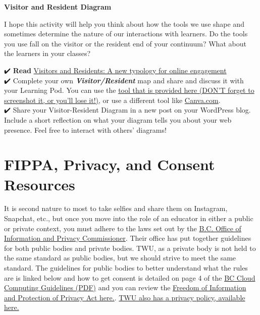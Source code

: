 \documentclass[
]{book}
\begin{document}
\begin{wp}
\textbf{Visitor and Resident Diagram}

I hope this activity will help you think about how the tools we use shape and sometimes determine the nature of our interactions with learners. Do the tools you use fall on the visitor or the resident end of your continuum? What about the learners in your classes?

✔️ \textbf{Read} \href{https://firstmonday.org/ojs/index.php/fm/article/view/3171}{Visitors and Residents: A new typology for online engagement}\\
✔️ Complete your own \textbf{\emph{Visitor/Resident}} map and share and discuss it with your Learning Pod. You can use the \href{https://experimental.worldcat.org/vandrmapping/editMap}{tool that is provided here (DON'T forget to screenshot it, or you'll lose it!)}, or use a different tool like \href{https://canva.com}{Canva.com}.\\
✔️ Share your Visitor-Resident Diagram in a new post on your WordPress blog. Include a short reflection on what your diagram tells you about your web presence. Feel free to interact with others' diagrams!
\end{wp}

\hypertarget{fippa-privacy-and-consent-resources}{%
\section{FIPPA, Privacy, and Consent Resources}\label{fippa-privacy-and-consent-resources}}

It is second nature to most to take selfies and share them on Instagram, Snapchat, etc., but once you move into the role of an educator in either a public or private context, you must adhere to the laws set out by the \href{https://www.oipc.bc.ca/}{B.C. Office of Information and Privacy Commissioner}. Their office has put together guidelines for both public bodies and private bodies. TWU, as a private body is not held to the same standard as public bodies, but we should strive to meet the same standard. The guidelines for public bodies to better understand what the rules are is linked below and how to get consent is detailed on page 4 of the \href{https://esquimalt.public.sd61.bc.ca/wp-content/uploads/sites/34/2013/09/OIPC-Cloud-Computing-Guidelines-for-Public-Bodies.pdf}{BC Cloud Computing Guidelines (PDF)} and you can review the \href{http://www.bclaws.ca/Recon/document/ID/freeside/96165_00}{Freedom of Information and Protection of Privacy Act here.}. \href{https://www.twu.ca/about/university-privacy-policy}{TWU also has a privacy policy, available here.}
\end{document}
